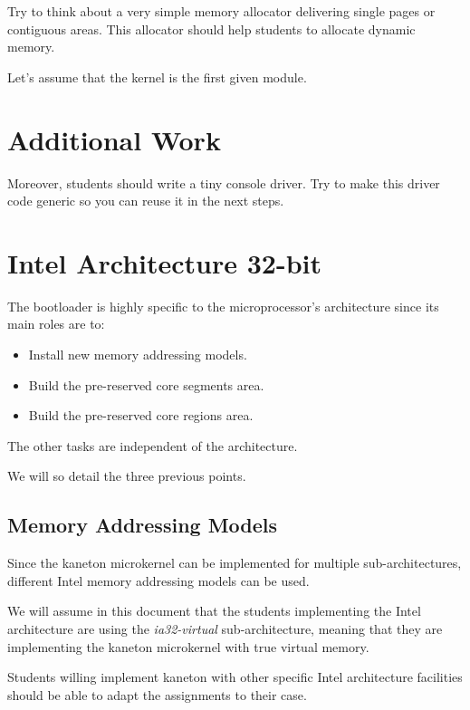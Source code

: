 Try to think about a very simple memory allocator delivering single
pages or contiguous areas. This allocator should help students to
allocate dynamic memory.

Let's assume that the kernel is the first given module.

%
%

\section{Additional Work}

Moreover, students should write a tiny console driver. Try to make this
driver code generic so you can reuse it in the next steps.

%
%

\section{Intel Architecture 32-bit}

The bootloader is highly specific to the microprocessor's architecture
since its main roles are to:

\begin{itemize}
  \item
    Install new memory addressing models.
  \item
    Build the pre-reserved core segments area.
  \item
    Build the pre-reserved core regions area.
\end{itemize}

The other tasks are independent of the architecture.

We will so detail the three previous points.

%
%

\subsection{Memory Addressing Models}

Since the kaneton microkernel can be implemented for multiple
sub-architectures, different Intel memory addressing models can be used.

We will assume in this document that the students implementing the
Intel architecture are using the \textit{ia32-virtual} sub-architecture,
meaning that they are implementing the kaneton microkernel with true
virtual memory.

Students willing implement kaneton with other specific Intel architecture
facilities should be able to adapt the assignments to their case.

